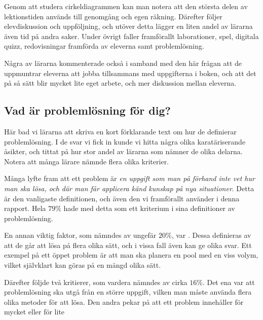 \textcolor{lila}{Genom att studera cirkeldiagrammen kan man notera att den största delen av lektionstiden används till genomgång och egen räkning. Därefter följer elevdiskussion och uppföljning, och utöver detta lägger en liten andel av lärarna även tid på andra saker. Under övrigt faller framförallt laborationer, spel, digitala quizz, redovisningar framförda av eleverna samt problemlösning.}

\textcolor{lila}{Några av lärarna kommenterade också i samband med den här frågan att de uppmuntrar eleverna att jobba tillsammans med uppgifterna i boken, och att det på så sätt blir mycket lite eget arbete, och mer diskussion mellan eleverna.}

\subsection{Vad är problemlösning för dig?}
\textcolor{lila}{Här bad vi lärarna att skriva en kort förklarande text om hur de definierar problemlösning. I de svar vi fick in kunde vi hitta några olika karatäriserande åsikter, och tittat på hur stor andel av lärarna som nämner de olika delarna. Notera att många lärare nämnde flera olika kriterier.}

\textcolor{lila}{Många lyfte fram att ett problem är \textsl{en uppgift som man på förhand inte vet hur man ska lösa, och där man får applicera känd kunskap på nya situationer}. Detta är den vanligaste definitionen, och även den vi framförallt använder i denna rapport. Hela $79\%$ hade med detta som ett kriterium i sina definitioner av problemlösning.}

\textcolor{lila}{En annan viktig faktor, som nämndes av ungefär $20\%$, var . Dessa definieras av att de går att lösa på flera olika sätt, och i vissa fall även kan ge olika svar. Ett exempel på ett öppet problem är att man ska planera en pool med en viss volym, vilket självklart kan göras på en mängd olika sätt.}

\textcolor{lila}{Därefter följde två kritierer, som vardera nämndes av cirka $16\%$. Det ena var att problemlösning ska utgå från en större uppgift, vilken man måste använda flera olika metoder för att lösa. Den andra pekar på att ett problem innehåller för mycket eller för lite }